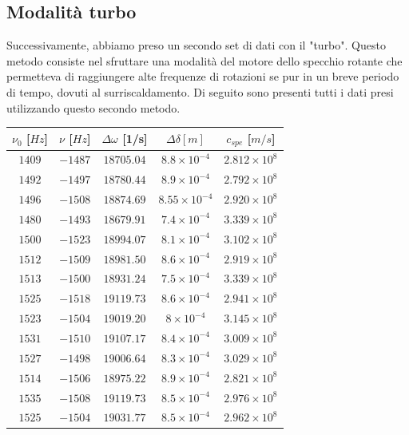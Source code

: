 \subsection{Modalità turbo}
Successivamente, abbiamo preso un secondo set di dati con il "turbo". Questo metodo consiste nel sfruttare una modalità del motore dello specchio rotante che permetteva di raggiungere alte frequenze di rotazioni se pur in un breve periodo di tempo, dovuti al surriscaldamento. Di seguito sono presenti tutti i dati presi utilizzando questo secondo metodo.
\begin{table}[ht]
    \centering
    \begin{tabular}{|c|c|c|c|c|}
    \hline
     $\nu_0$ [$Hz$] & $\nu$ [$Hz$] & $\Delta \omega$ [1/s] & $\Delta\delta[m]$ & $c_{spe}$ [$m/s$] \\
    \hline
    $1409$ & $-1487$ & $18705.04$ & $8.8\times10^{-4}$ & $2.812\times10^8$ \\
    \hline
    $1492$ & $-1497$ & $18780.44$ & $8.9\times10^{-4}$ & $2.792\times10^8$ \\
    \hline
    $1496$ & $-1508$ & $18874.69$ & $8.55\times10^{-4}$ & $2.920\times10^8$ \\
    \hline
    $1480$ & $-1493$ & $18679.91$ & $7.4\times10^{-4}$ & $3.339\times10^8$ \\
    \hline
    $1500$ & $-1523$ & $18994.07$ & $8.1\times10^{-4}$ & $3.102\times10^8$ \\
    \hline
    $1512$ & $-1509$ & $18981.50$ & $8.6\times10^{-4}$ & $2.919\times10^8$ \\
    \hline
    $1513$ & $-1500$ & $18931.24$ & $7.5\times10^{-4}$ & $3.339\times10^8$ \\
    \hline
    $1525$ & $-1518$ & $19119.73$ & $8.6\times10^{-4}$ & $2.941\times10^8$ \\
    \hline
    $1523$ & $-1504$ & $19019.20$ & $8\times10^{-4}$ & $3.145\times10^8$ \\
    \hline
    $1531$ & $-1510$ & $19107.17$ & $8.4\times10^{-4}$ & $3.009\times10^8$ \\
    \hline
    $1527$ & $-1498$ & $19006.64$ & $8.3\times10^{-4}$ & $3.029\times10^8$ \\
    \hline
    $1514$ & $-1506$ & $18975.22$ & $8.9\times10^{-4}$ & $2.821\times10^8$ \\
    \hline
    $1535$ & $-1508$ & $19119.73$ & $8.5\times10^{-4}$ & $2.976\times10^8$ \\
    \hline
    $1525$ & $-1504$ & $19031.77$ & $8.5\times10^{-4}$ & $2.962\times10^8$ \\

\end{tabular}
\end{table}
